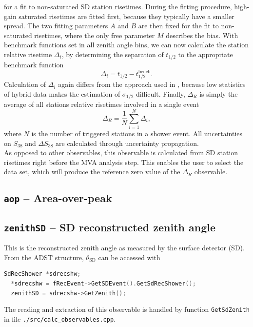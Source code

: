 \documentclass[12pt,a4paper]{report}
\begin{document}
for a fit to non-saturated SD station risetimes. During the fitting procedure, high-gain saturated risetimes are fitted first, because they typically have a smaller spread. The two fitting parameters $A$ and $B$ are then fixed for the fit to non-saturated risetimes, where the only free parameter $M$ describes the bias. With benchmark functions set in all zenith angle bins, we can now calculate the station relative risetime $\Delta_i$, by determining the separation of $t_{1/2}$ to the appropriate benchmark function
\begin{equation}
\Delta_i = t_{1/2} - t_{1/2}^{\textrm{bench}}.
\end{equation}
Calculation of $\Delta_i$ again differs from the approach used in \cite{deltaMethod}, because low statistics of hybrid data makes the estimation of $\sigma_{1/2}$ difficult. Finally, $\Delta_R$ is simply the average of all stations relative risetimes involved in a single event
\begin{equation}
\Delta_R = \frac{1}{N} \displaystyle\sum_{i = 1}^{N} \Delta_i,
\end{equation}
where $N$ is the number of triggered stations in a shower event. All uncertainties on $S_{38}$ and $\Delta S_{38}$ are calculated through uncertainty propagation.\\
As opposed to other observables, this observable is calculated from SD station risetimes right before the MVA analysis step. This enables the user to select the data set, which will produce the reference zero value of the $\Delta_R$ observable.

\subsection{\texttt{aop} -- Area-over-peak}

\subsection{\texttt{zenithSD} -- SD reconstructed zenith angle}
This is the reconstructed zenith angle as measured by the surface detector (SD). From the ADST structure, $\theta_{\textrm{SD}}$ can be accessed with
\begin{lstlisting}[language=C++]
  SdRecShower *sdrecshw;
  *sdrecshw = fRecEvent->GetSDEvent().GetSdRecShower();
  zenithSD = sdrecshw->GetZenith();
\end{lstlisting}
The reading and extraction of this observable is handled by function \texttt{GetSdZenith} in file \texttt{./src/calc\_observables.cpp}.
\end{document}
